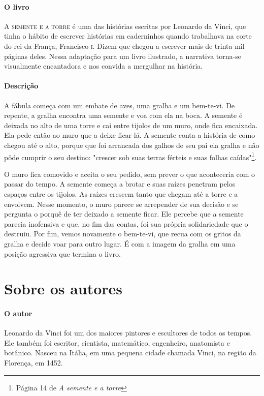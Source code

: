 \documentclass[11pt]{extarticle}
\begin{document}
\paragraph{O livro} \textsc{A semente e a torre} é uma das histórias escritas por Leonardo da Vinci, que tinha o hábito de escrever histórias em caderninhos quando trabalhava na corte do rei da França, Francisco \textsc{i}. Dizem que chegou a escrever mais de trinta mil páginas deles. Nessa adaptação para um livro ilustrado, a narrativa torna-se visualmente encantadora e nos convida a mergulhar na história.

\paragraph{Descrição} A fábula começa com um embate de aves, uma gralha e um bem-te-vi. De repente, a gralha encontra uma semente e voa com ela na boca. A semente é deixada no alto de uma torre e cai entre tijolos de um muro, onde fica encaixada. Ela pede então ao muro que a deixe ficar lá. A semente conta a história de como chegou até o alto, porque que foi arrancada dos galhos de seu pai ela gralha e não pôde cumprir o seu destino: "crescer sob suas terras férteis e suas folhas caídas"\footnote{Página 14 de \textit{A semente e a torre}}. 

O muro fica comovido e aceita o seu pedido, sem prever o que aconteceria com o passar do tempo. A semente começa a brotar e suas raízes penetram pelos espaços entre os tijolos. As raízes crescem tanto que chegam até a torre e a envolvem. Nesse momento, o muro parece se arrepender de sua decisão e se pergunta o porquê de ter deixado a semente ficar. Ele percebe que a semente parecia inofensiva e que, no fim das contas, foi sua própria solidariedade que o destruiu. Por fim, vemos novamente o bem-te-vi, que recua com os gritos da gralha e decide voar para outro lugar. É com a imagem da gralha em uma posição agressiva que termina o livro.

\section{Sobre os autores}


\paragraph{O autor} Leonardo da Vinci foi um dos maiores pintores e escultores de todos os tempos. Ele também foi escritor, cientista, matemático, engenheiro, anatomista e botânico. Nasceu na Itália, em uma pequena cidade chamada Vinci, na região da Florença, em 1452.
\end{document}

